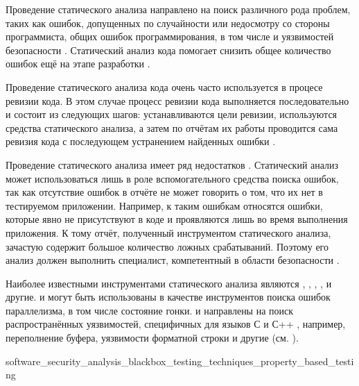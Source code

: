 %
Проведение статического анализа направлено на поиск различного рода проблем, таких как ошибок, допущенных по случайности или недосмотру со стороны программиста, общих ошибок программирования, в том числе и уязвимостей безопасности . 
%
Статический анализ кода помогает снизить общее количество ошибок ещё на этапе разработки 
.

%
Проведение статического анализа кода очень часто используется в процесе ревизии кода. 
%
В этом случае процесс ревизии кода выполняется последовательно и состоит из следующих шагов: устанавливаются цели ревизии, используются средства статического анализа, а затем по отчётам их работы проводится сама ревизия кода с последующем устранением найденных ошибки . 

%
Проведение статического анализа имеет ряд недостатков  . 
%
Статический анализ может использоваться лишь в роле вспомогательного средства поиска ошибок, так как отсутствие ошибок в отчёте не может говорить о том, что их нет в тестируемом приложении. 
%
Например, к таким ошибкам относятся ошибки, которые явно не присутствуют в коде и проявляются лишь во время выполнения приложения. 
%
К тому отчёт, полученный инструментом статического анализа, зачастую содержит большое количество ложных срабатываний. 
%
Поэтому его анализ должен выполнить специалист, компетентный в области безопасности .

%
Наиболее известными инструментами статического анализа являются  ,  ,  ,  ,   и другие. 
%
 и  могут быть использованы в качестве инструментов поиска ошибок параллелизма, в том числе состояние гонки. 
%
 и  направлены на поиск распространённых уязвимостей, специфичных для языков С  и С++ , например, переполнение буфера, уязвимости форматной строки и другие (см. ).


	{software_security_analysis_blackbox_testing_techniques_property_based_testing}

